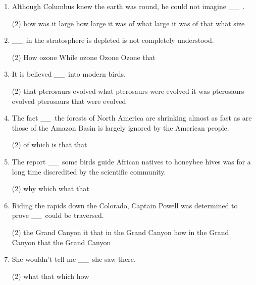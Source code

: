 \documentclass{yufa}
\newcommand\ttu{ \_\_\ }
\begin{document}
\begin{enumerate}

\item Although Columbus knew the earth was round, he could not imagine \ttu.
\begin{tasks}(2)
  \task how was it large
  \task how large it was
  \task of what large it was
  \task of that what size
\end{tasks}

\item \ttu in the stratosphere is depleted is not completely understood.
\begin{tasks}(2)
  \task How ozone
  \task While ozone
  \task Ozone
  \task Ozone that
\end{tasks}

\item It is believed \ttu into modern birds.
\begin{tasks}(2)
  \task that pterosaurs evolved
  \task what pterosaurs were evolved
  \task it was pterosaurs evolved
  \task pterosaurs that were evolved
\end{tasks}

\item The fact \ttu the forests of North America are shrinking almost as fast as are those of the Amazon Basin is largely ignored by the American people.
\begin{tasks}(2)
  \task of
  \task which
  \task is that
  \task that
\end{tasks}

\item The report \ttu some birds guide African natives to honeybee hives was for a long time discredited by the scientific community.
\begin{tasks}(2)
  \task why
  \task which
  \task what
  \task that
\end{tasks}

\item Riding the rapids down the Colorado, Captain Powell was determined to prove \ttu could be traversed.
\begin{tasks}(2)
  \task the Grand Canyon it
  \task that in the Grand Canyon
  \task how in the Grand Canyon
  \task that the Grand Canyon
\end{tasks}

\item She wouldn't tell me \ttu she saw there.
\begin{tasks}(2)
  \task what
  \task that
  \task which
  \task how
\end{tasks}


\end{enumerate}
\end{document}
